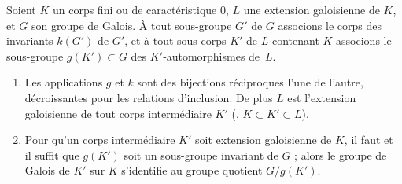 \documentclass[11pt, %
  title in boldface,
  theorem in new line,
  theorem numbering = section,
  number theorems separately,
  simple name,
]{beaulivre}
\begin{document}
    \begin{theorem}\label{thm:correspondance de Galois}
        Soient \( K \) un corps fini ou de caractéristique \( 0 \), \( L \) une extension galoisienne de \( K \), et \( G \) son groupe de Galois. À tout sous-groupe \( G' \) de \( G \) associons le corps des invariants \( k(G') \) de \( G' \), et à tout sous-corps \( K' \) de \( L \) contenant \( K \) associons le sous-groupe \( g(K') \subset G \) des \( K' \)‑automorphismes de~\( L \).
        \begin{enumerate}
            \item \label{thm:correspondance de Galois;item1} Les applications \( g \) et \( k \) sont des bijections réciproques l'une de l'autre, décroissantes pour les relations d'inclusion. De plus \( L \) est l'extension galoisienne de tout corps intermédiaire \( K' \) (\ie. \( K \subset K' \subset L \)).
            \item \label{thm:correspondance de Galois;item2} Pour qu'un corps intermédiaire \( K' \) soit extension galoisienne de \( K \), il faut et il suffit que \( g(K') \) soit un sous-groupe invariant de \( G \) ; alors le groupe de Galois de \( K' \) sur \( K \) s'identifie au groupe quotient \( G/g(K') \).
        \end{enumerate}
    \end{theorem}
\end{document}
